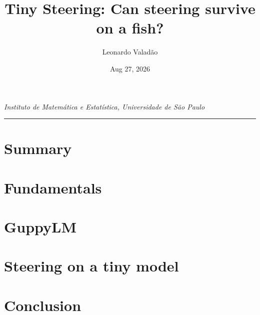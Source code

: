 \documentclass[12pt]{article}
\begin{document}
 
 
\title{Tiny Steering: Can steering survive on a fish?} %
\author{Leonardo Valadão} %
\date{Aug 27, 2026}
\maketitle

{%
\centering
\textit{Instituto de Matemática e Estatística, Universidade de São Paulo} %
\par
}
\hrule
\vspace{.2in}

\section*{Summary}


\section{Fundamentals}


\section{GuppyLM}


\section{Steering on a tiny model}


\section{Conclusion}



 
 
\end{document}
